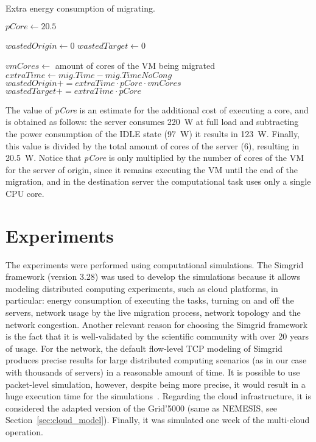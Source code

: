 \begin{algorithm}
\begin{algorithmic}
\caption{Extra energy consumption of migrating.}\label{alg:wasted_energy}

\State $pCore \gets 20.5$

\State $wastedOrigin \gets 0$
\State $wastedTarget \gets 0$

    \State $vmCores \gets$ amount of cores of the VM being migrated
    \State $extraTime \gets mig.Time - mig.TimeNoCong$
        \State $wastedOrigin += extraTime \cdot pCore \cdot vmCores$ 
        \State $wastedTarget += extraTime \cdot pCore$ 
    \EndIf
\EndFor
\end{algorithmic}
\end{algorithm}

The value of \textit{pCore} is an estimate for the additional cost of executing a core, and is obtained as follows: the server consumes \SI{220}{\watt} at full load and subtracting the power consumption of the IDLE state (\SI{97}{\watt}) it results in \SI{123}{\watt}. Finally, this value is divided by the total amount of cores of the server (6), resulting in \SI{20.5}{\watt}. Notice that \textit{pCore} is only multiplied by the number of cores of the VM for the server of origin, since it remains executing the VM until the end of the migration, and in the destination server the computational task uses only a single CPU core.


\section{Experiments}
\label{sec:simulations_smargreens}

The experiments were performed using computational simulations. The Simgrid~\cite{CASANOVA20142899} framework (version 3.28) was used to develop the simulations because it allows modeling distributed computing experiments, such as cloud platforms, in particular: energy consumption of executing the tasks, turning on and off the servers, network usage by the live migration process, network topology and the network congestion. Another relevant reason for choosing the Simgrid framework is the fact that it is well-validated by the scientific community with over 20 years of usage. For the network, the default flow-level TCP modeling of Simgrid produces precise results for large distributed computing scenarios (as in our case with thousands of servers) in a reasonable amount of time. It is possible to use packet-level simulation, however, despite being more precise, it would result in a huge execution time for the simulations~\cite{velho2013simgridparameters}. Regarding the cloud infrastructure, it is considered the adapted version of the Grid'5000 (same as NEMESIS, see Section~\ref{sec:cloud_model}). Finally, it was simulated one week of the multi-cloud operation.

